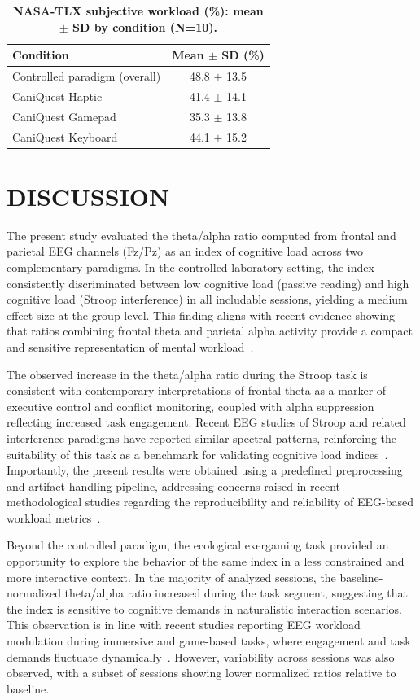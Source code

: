 \documentclass[letterpaper, 10 pt, conference]{ieeeconf}
\begin{document}
\begin{table}[H]
\centering
\caption{\textbf{NASA-TLX subjective workload (\%): mean $\pm$ SD by condition (N=10).}}
\label{tab:nasa_tlx}
\begin{tabular}{lc}
\toprule
\textbf{Condition} & \textbf{Mean $\pm$ SD (\%)} \\
\midrule
Controlled paradigm (overall) & 48.8 $\pm$ 13.5 \\
CaniQuest Haptic & 41.4 $\pm$ 14.1 \\
CaniQuest Gamepad & 35.3 $\pm$ 13.8 \\
CaniQuest Keyboard & 44.1 $\pm$ 15.2 \\
\bottomrule
\end{tabular}
\end{table}
    
\section{DISCUSSION}

The present study evaluated the theta/alpha ratio computed from frontal and parietal EEG channels (Fz/Pz) as an index of cognitive load across two complementary paradigms. In the controlled laboratory setting, the index consistently discriminated between low cognitive load (passive reading) and high cognitive load (Stroop interference) in all includable sessions, yielding a medium effect size at the group level. This finding aligns with recent evidence showing that ratios combining frontal theta and parietal alpha activity provide a compact and sensitive representation of mental workload~\cite{c1,c3,c7}.

The observed increase in the theta/alpha ratio during the Stroop task is consistent with contemporary interpretations of frontal theta as a marker of executive control and conflict monitoring, coupled with alpha suppression reflecting increased task engagement. Recent EEG studies of Stroop and related interference paradigms have reported similar spectral patterns, reinforcing the suitability of this task as a benchmark for validating cognitive load indices~\cite{c5,c9}. Importantly, the present results were obtained using a predefined preprocessing and artifact-handling pipeline, addressing concerns raised in recent methodological studies regarding the reproducibility and reliability of EEG-based workload metrics~\cite{c4,c6}.

Beyond the controlled paradigm, the ecological exergaming task provided an opportunity to explore the behavior of the same index in a less constrained and more interactive context. In the majority of analyzed sessions, the baseline-normalized theta/alpha ratio increased during the task segment, suggesting that the index is sensitive to cognitive demands in naturalistic interaction scenarios. This observation is in line with recent studies reporting EEG workload modulation during immersive and game-based tasks, where engagement and task demands fluctuate dynamically~\cite{c2,c3}. However, variability across sessions was also observed, with a subset of sessions showing lower normalized ratios relative to baseline.
\end{document}
